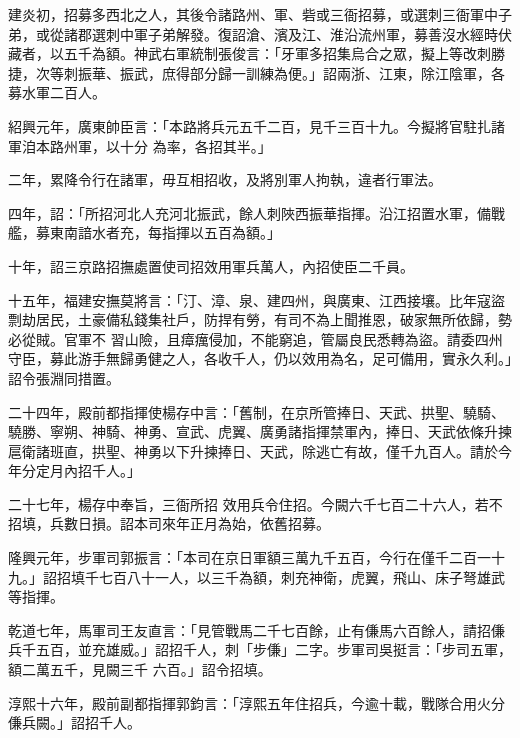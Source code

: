 \begin{pinyinscope}
 建炎初，招募多西北之人，其後令諸路州、軍、砦或三衙招募，或選刺三衙軍中子弟，或從諸郡選刺中軍子弟解發。復詔滄、濱及江、淮沿流州軍，募善沒水經時伏藏者，以五千為額。神武右軍統制張俊言：「牙軍多招集烏合之眾，擬上等改刺勝捷，次等刺振華、振武，庶得部分歸一訓練為便。」詔兩浙、江東，除江陰軍，各募水軍二百人。



 紹興元年，廣東帥臣言：「本路將兵元五千二百，見千三百十九。今擬將官駐扎諸軍洎本路州軍，以十分
 為率，各招其半。」



 二年，累降令行在諸軍，毋互相招收，及將別軍人拘執，違者行軍法。



 四年，詔：「所招河北人充河北振武，餘人刺陜西振華指揮。沿江招置水軍，備戰艦，募東南諳水者充，每指揮以五百為額。」



 十年，詔三京路招撫處置使司招效用軍兵萬人，內招使臣二千員。



 十五年，福建安撫莫將言：「汀、漳、泉、建四州，與廣東、江西接壤。比年寇盜剽劫居民，土豪備私錢集社戶，防捍有勞，有司不為上聞推恩，破家無所依歸，勢必從賊。官軍不
 習山險，且瘴癘侵加，不能窮追，管屬良民悉轉為盜。請委四州守臣，募此游手無歸勇健之人，各收千人，仍以效用為名，足可備用，實永久利。」詔令張淵同措置。



 二十四年，殿前都指揮使楊存中言：「舊制，在京所管捧日、天武、拱聖、驍騎、驍勝、寧朔、神騎、神勇、宣武、虎翼、廣勇諸指揮禁軍內，捧日、天武依條升揀扈衛諸班直，拱聖、神勇以下升揀捧日、天武，除逃亡有故，僅千九百人。請於今年分定月內招千人。」



 二十七年，楊存中奉旨，三衙所招
 效用兵令住招。今闕六千七百二十六人，若不招填，兵數日損。詔本司來年正月為始，依舊招募。



 隆興元年，步軍司郭振言：「本司在京日軍額三萬九千五百，今行在僅千二百一十九。」詔招填千七百八十一人，以三千為額，刺充神衛，虎翼，飛山、床子弩雄武等指揮。



 乾道七年，馬軍司王友直言：「見管戰馬二千七百餘，止有傔馬六百餘人，請招傔兵千五百，並充雄威。」詔招千人，刺「步傔」二字。步軍司吳挺言：「步司五軍，額二萬五千，見闕三千
 六百。」詔令招填。



 淳熙十六年，殿前副都指揮郭鈞言：「淳熙五年住招兵，今逾十載，戰隊合用火分傔兵闕。」詔招千人。




\end{pinyinscope}
